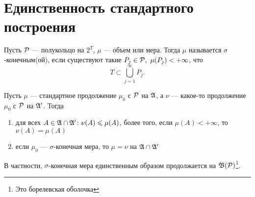 \section{Единственность стандартного построения}
\begin{defn}
	Пусть $ \P$ --- полукольцо на $ 2^{T}$, $ \mu$ --- объем или мера. Тогда $ \mu$ называется \textsf{$ \sigma $-конечным(ой)}, если существуют такие $ P_j \in \P, ~  \mu(P_j) < +\infty$, что
	\[
	T \subset \bigcup_{j=1}^{\infty} P_j
	.\] 
\end{defn}
\begin{thm}
    Пусть $ \mu$ --- стандартное продолжение $ \mu_0 $ с $ \P$ на $ \A$, а  $ \nu $ --- какое-то продолжение  $ \mu_0$ с $ \P$ на $ \A'$. Тогда
	\begin{enumerate}[noitemsep]
		\item для всех $ A \in \A \cap \A'\colon \nu (A) \le \mu(A)$, более того, если $ \mu(A) <+ \infty$, то $ \nu (A) = \mu(A)$ 
		\item если $ \mu_0$ --- $ \sigma $-конечная мера, то $ \mu= \nu $ на $ \A \cap \A'$ 
	\end{enumerate} 
	В частности, $ \sigma $-конечная мера единственным образом продолжается на $ \mathfrak{B}(\P)$\footnote{Это борелевская оболочка}.
\end{thm}
